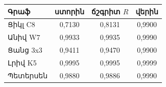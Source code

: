 \begin{tabular}{|l|c|c|c|}
\hline
Գրաֆ & ստորին & ճշգրիտ $R$ & վերին\\
\hline
Ցիկլ C8 & 0{,}7130 & 0{,}8131 & 0{,}9900\\
\hline
Անիվ W7 & 0{,}9933 & 0{,}9935 & 0{,}9990\\
\hline
Ցանց 3x3 & 0{,}9411 & 0{,}9470 & 0{,}9900\\
\hline
Լրիվ K5 & 0{,}9995 & 0{,}9995 & 0{,}9999\\
\hline
Պետերսեն & 0{,}9880 & 0{,}9886 & 0{,}9990\\
\hline
\end{tabular}
